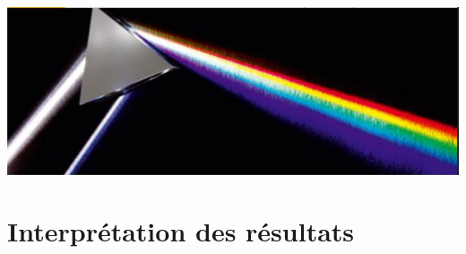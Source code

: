\begin{center}
    \includegraphics[scale=1.1]{Images/Dispersion.PNG}
\end{center}

\section{Interprétation des résultats}

